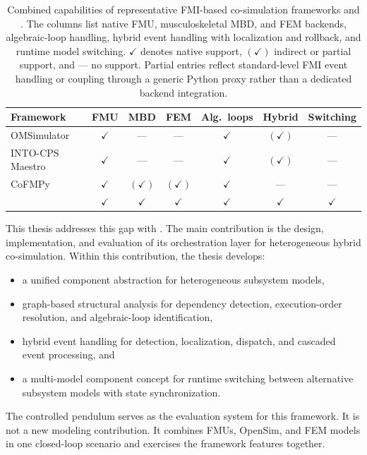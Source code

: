 \begin{table}[t]
  \centering
  \small
  \caption[Co-simulation framework capability comparison.]{%
  Combined capabilities of representative \ac{FMI}-based co-simulation frameworks and \syssimx{}.
  The columns list native \ac{FMU}, musculoskeletal \ac{MBD}, and \ac{FEM} backends, algebraic-loop handling, hybrid event handling with localization and rollback, and runtime model switching.
  \(\checkmark\) denotes native support, \((\checkmark)\) indirect or partial support, and --- no support.
  Partial entries reflect standard-level \ac{FMI} event handling or coupling through a generic Python proxy rather than a dedicated backend integration.}
  \label{tab:framework_comparison}
  \begin{tabular}{l c c c c c c}
    \toprule
    \textbf{Framework} & \textbf{\ac{FMU}} & \textbf{MBD} & \textbf{\ac{FEM}}
      & \textbf{Alg.\ loops} & \textbf{Hybrid} & \textbf{Switching} \\
    \midrule
    OMSimulator~\cite{ochel_omsimulator_2019}    & \(\checkmark\) & ---             & ---             & \(\checkmark\) & \((\checkmark)\) & ---           \\
    INTO-CPS Maestro~\cite{thule_maestro_2019}   & \(\checkmark\) & ---             & ---             & \(\checkmark\) & \((\checkmark)\) & ---           \\
    CoFMPy~\cite{friedrich_cofmpy_2025}          & \(\checkmark\) & \((\checkmark)\) & \((\checkmark)\) & \(\checkmark\) & ---             & ---           \\
    \textbf{\syssimx{}}                          & \(\checkmark\) & \(\checkmark\)  & \(\checkmark\)  & \(\checkmark\) & \(\checkmark\)  & \(\checkmark\) \\
    \bottomrule
  \end{tabular}
\end{table}

This thesis addresses this gap with \syssimx{}.
The main contribution is the design, implementation, and evaluation of its orchestration layer for heterogeneous hybrid co-simulation.
Within this contribution, the thesis develops:
\begin{itemize}
    \item a unified component abstraction for heterogeneous subsystem models,
    \item graph-based structural analysis for dependency detection, execution-order resolution, and algebraic-loop identification,
    \item hybrid event handling for detection, localization, dispatch, and cascaded event processing, and
    \item a multi-model component concept for runtime switching between alternative subsystem models with state synchronization.
\end{itemize}
The controlled pendulum serves as the evaluation system for this framework.
It is not a new modeling contribution.
It combines \acp{FMU}, OpenSim, and \ac{FEM} models in one closed-loop scenario and exercises the framework features together.